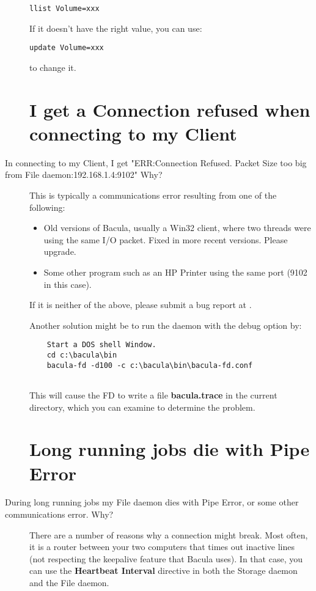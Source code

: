 \begin{description}
\footnotesize
\begin{verbatim}
llist Volume=xxx
\end{verbatim}
\normalsize

If it doesn't have the right value, you can use: 

\footnotesize
\begin{verbatim}
update Volume=xxx
\end{verbatim}
\normalsize

to change it.  

\label{ConnectionRefused}
\section{I get a Connection refused when connecting to my Client}
\item [In connecting to my Client, I get "ERR:Connection Refused.  Packet
   Size too big from File daemon:192.168.1.4:9102" Why?]
   This is typically a communications error resulting  from one of the
   following:
 

\begin{itemize}
\item Old versions of Bacula, usually a Win32 client, where two  threads were
   using the same I/O packet. Fixed in more recent  versions. Please upgrade.  
\item Some other program such as an HP Printer using the same  port (9102 in
   this case).  
\end{itemize}

If it is neither of the above, please submit a bug report at  
.  

Another solution might be to run the daemon with the debug  option by:  

\footnotesize
\begin{verbatim}
    Start a DOS shell Window.
    cd c:\bacula\bin
    bacula-fd -d100 -c c:\bacula\bin\bacula-fd.conf
    
\end{verbatim}
\normalsize

This will cause the FD to write a file {\bf bacula.trace}  in the current
directory, which you can examine to determine  the problem.  

\section{Long running jobs die with Pipe Error}
\item [During long running jobs my File daemon dies with Pipe Error, or
       some other communications error. Why?]
   There are a number of reasons why a connection might break.
   Most often, it is a router between your two computers that times out
   inactive lines (not respecting the keepalive feature that Bacula uses).
   In that case, you can use the {\bf Heartbeat Interval} directive in
   both the Storage daemon and the File daemon. 


\end{description}
